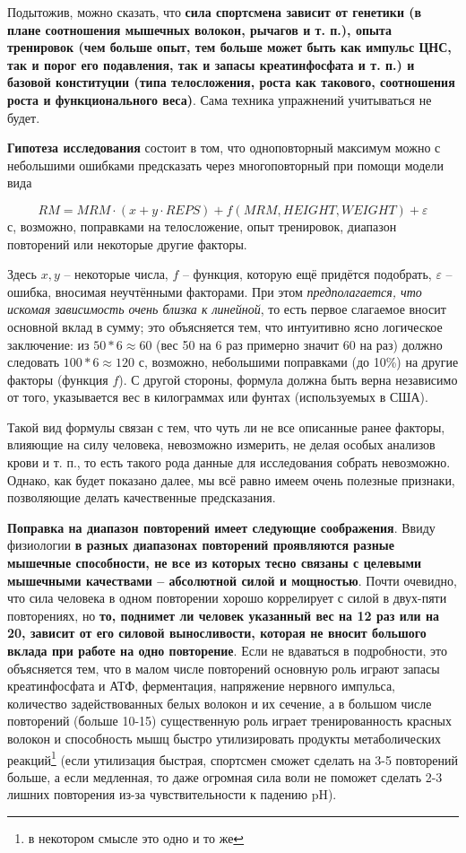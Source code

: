 \documentclass[
]{article}
\begin{document}
Подытожив, можно сказать, что \textbf{сила спортсмена зависит от
генетики (в плане соотношения мышечных волокон, рычагов и т. п.), опыта
тренировок (чем больше опыт, тем больше может быть как импульс ЦНС, так
и порог его подавления, так и запасы креатинфосфата и т. п.) и базовой
конституции (типа телосложения, роста как такового, соотношения роста и
функционального веса)}. Сама техника упражнений учитываться не будет.

\textbf{Гипотеза исследования} состоит в том, что одноповторный максимум
можно с небольшими ошибками предсказать через многоповторный при помощи
модели вида

\[RM=MRM \cdot (x+y\cdot REPS)+f(MRM,HEIGHT,WEIGHT)+\varepsilon\] с,
возможно, поправками на телосложение, опыт тренировок, диапазон
повторений или некоторые другие факторы.

Здесь \(x, y\) -- некоторые числа, \(f\) -- функция, которую ещё
придётся подобрать, \(\varepsilon\) -- ошибка, вносимая неучтёнными
факторами. При этом \emph{предполагается, что искомая зависимость очень
близка к линейной}, то есть первое слагаемое вносит основной вклад в
сумму; это объясняется тем, что интуитивно ясно логическое заключение:
из \(50*6 \approx 60\) (вес 50 на 6 раз примерно значит 60 на раз)
должно следовать \(100*6 \approx 120\) с, возможно, небольшими
поправками (до 10\%) на другие факторы (функция \(f\)). С другой
стороны, формула должна быть верна независимо от того, указывается вес в
килограммах или фунтах (используемых в США).

Такой вид формулы связан с тем, что чуть ли не все описанные ранее
факторы, влияющие на силу человека, невозможно измерить, не делая особых
анализов крови и т. п., то есть такого рода данные для исследования
собрать невозможно. Однако, как будет показано далее, мы всё равно имеем
очень полезные признаки, позволяющие делать качественные предсказания.

\textbf{Поправка на диапазон повторений имеет следующие соображения}.
Ввиду физиологии \textbf{в разных диапазонах повторений проявляются
разные мышечные способности, не все из которых тесно связаны с целевыми
мышечными качествами -- абсолютной силой и мощностью}. Почти очевидно,
что сила человека в одном повторении хорошо коррелирует с силой в
двух-пяти повторениях, но \textbf{то, поднимет ли человек указанный вес
на 12 раз или на 20, зависит от его силовой выносливости, которая не
вносит большого вклада при работе на одно повторение}. Если не вдаваться
в подробности, это объясняется тем, что в малом числе повторений
основную роль играют запасы креатинфосфата и АТФ, ферментация,
напряжение нервного импульса, количество задействованных белых волокон и
их сечение, а в большом числе повторений (больше 10-15) существенную
роль играет тренированность красных волокон и способность мышц быстро
утилизировать продукты метаболических реакций\footnote{в некотором
  смысле это одно и то же} (если утилизация быстрая, спортсмен сможет
сделать на 3-5 повторений больше, а если медленная, то даже огромная
сила воли не поможет сделать 2-3 лишних повторения из-за
чувствительности к падению pH).
\end{document}
